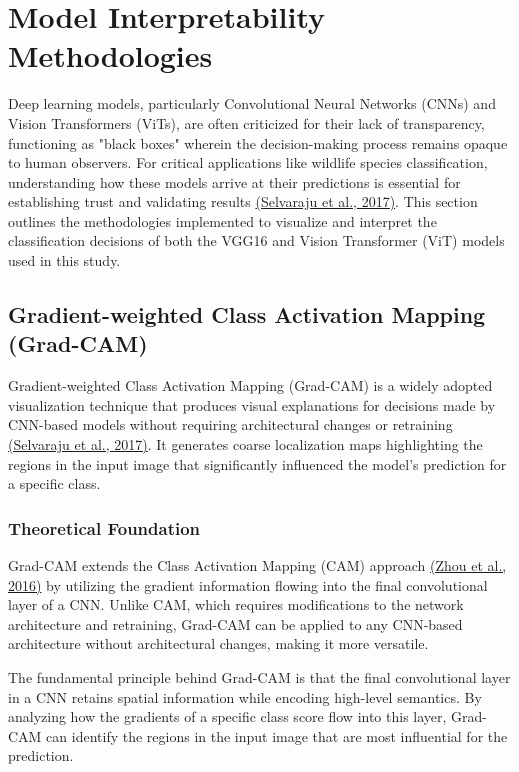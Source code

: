 \documentclass[a4paper,12pt]{article}
\begin{document}
\section{Model Interpretability Methodologies}

Deep learning models, particularly Convolutional Neural Networks (CNNs) and Vision Transformers (ViTs), are often criticized for their lack of transparency, functioning as "black boxes" wherein the decision-making process remains opaque to human observers. For critical applications like wildlife species classification, understanding how these models arrive at their predictions is essential for establishing trust and validating results \href{https://arxiv.org/abs/1610.02391}{(Selvaraju et al., 2017)}. This section outlines the methodologies implemented to visualize and interpret the classification decisions of both the VGG16 and Vision Transformer (ViT) models used in this study.

\subsection{Gradient-weighted Class Activation Mapping (Grad-CAM)}

Gradient-weighted Class Activation Mapping (Grad-CAM) is a widely adopted visualization technique that produces visual explanations for decisions made by CNN-based models without requiring architectural changes or retraining \href{https://arxiv.org/abs/1610.02391}{(Selvaraju et al., 2017)}. It generates coarse localization maps highlighting the regions in the input image that significantly influenced the model's prediction for a specific class.

\subsubsection{Theoretical Foundation}

Grad-CAM extends the Class Activation Mapping (CAM) approach \href{https://arxiv.org/abs/1512.04150}{(Zhou et al., 2016)} by utilizing the gradient information flowing into the final convolutional layer of a CNN. Unlike CAM, which requires modifications to the network architecture and retraining, Grad-CAM can be applied to any CNN-based architecture without architectural changes, making it more versatile.

The fundamental principle behind Grad-CAM is that the final convolutional layer in a CNN retains spatial information while encoding high-level semantics. By analyzing how the gradients of a specific class score flow into this layer, Grad-CAM can identify the regions in the input image that are most influential for the prediction.
\end{document}
